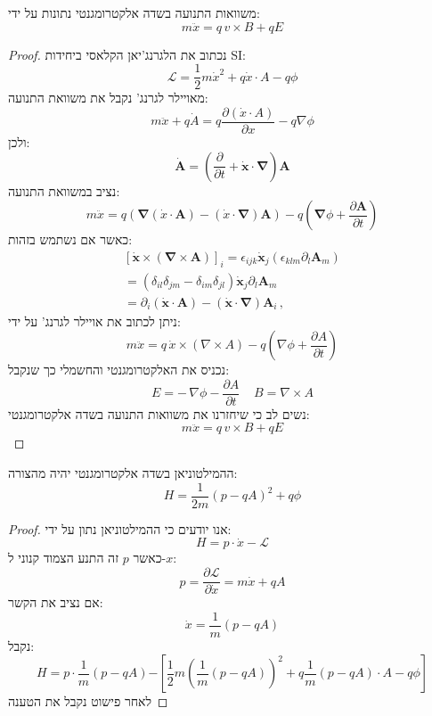 \documentclass{tstextbook}
\begin{document}
\begin{proposition}
משוואות התנועה בשדה אלקטרומגנטי נתונות על ידי:
$$m{\ddot{x}}=q\,v\times B+q E$$

\end{proposition}
\begin{proof}
נכתוב את הלגרנג'יאן הקלאסי ביחידות SI:
$${\mathcal{L}}={\frac{1}{2}}m{\dot{x}}^{2}+q{\dot{x}}\cdot A-q\phi$$
מאויילר לגרנג' נקבל את משוואת התנועה:
$$m{\ddot{x}}+q{\dot{A}}=q{\frac{\partial({\dot{x}}\cdot A)}{\partial x}}-q\nabla\phi$$
ולכן:
$$\dot{\mathbf{A}}=\left({\frac{\partial}{\partial t}}+{\dot{\mathbf{x}}}\cdot\mathbf{\nabla}\right)\mathbf{A}$$
נציב במשוואת התנועה:
$$m{\ddot{x}}=q\left(\mathbf{\nabla}({\dot{x}}\cdot\mathbf{A})-({\dot{x}}\cdot\mathbf{\nabla})\mathbf{A}\right)-q\left(\mathbf{\nabla}\phi+{\frac{\partial\mathbf{A}}{\partial t}}\right)$$
כאשר אם נשתמש בזהות:
$$\begin{array}{c}{{\left[\dot{\mathbf{x}}\times\left(\mathbf{\nabla}\times\mathbf{A}\right)\right]_{i}=\epsilon_{i j k}\dot{\mathbf{x}}_{j}\left(\epsilon_{k l m}\partial_{l}\mathbf{A}_{m}\right)}}\\ {{=\left(\delta_{i l}\delta_{j m}-\delta_{i m}\delta_{j l}\right)\dot{\mathbf{x}}_{j}\partial_{l}\mathbf{A}_{m}}}\\ {{=\partial_{i}\left(\dot{\mathbf{x}}\cdot\mathbf{A}\right)-\left(\dot{\mathbf{x}}\cdot\mathbf{\nabla}\right)\mathbf{A}_{i}\,,}}\end{array}$$
ניתן לכתוב את אויילר לגרנג' על ידי:
$$m{\ddot{x}}=q\,{\dot{x}}\times(\nabla\times A)-q\left(\nabla\phi+{\frac{\partial A}{\partial t}}\right)$$
נכניס את האלקטרומגנטי והחשמלי כך שנקבל:
$$E=-\,\nabla\phi-\frac{\partial A}{\partial t}\;\;\;\;B=\nabla\times A$$
נשים לב כי שיחזרנו את משוואות התנועה בשדה אלקטרומגנטי:
$$m{\ddot{x}}=q\,v\times B+q E$$

\end{proof}
\begin{proposition}
ההמילטוניאן בשדה אלקטרומגנטי יהיה מהצורה:
$$H=\frac{1}{2m}\left(p-q A\right)^{2}+q\phi$$

\end{proposition}
\begin{proof}
אנו יודעים כי ההמילטוניאן נתון על ידי:
$$H=p\cdot\dot{x}-{\mathcal{L}}$$
כאשר \(p\) זה התנע הצמוד קנוני ל-\(x\):
$$p={\frac{\partial{\mathcal{L}}}{\partial{\dot{x}}}}=m{\dot{x}}+q A$$
אם נציב את הקשר:
$${\dot{x}}={\frac{1}{m}}\left(p-q A\right)$$
נקבל:
$${{H=p\cdot\frac{1}{m}\left(p-q A\right)}} {{-\left[\frac{1}{2}m\left(\frac{1}{m}\left(p-q A\right)\right)^{2}+q\frac{1}{m}\left(p-q A\right)\cdot A-q\phi\right]}}$$
לאחר פישוט נקבל את הטענה

\end{proof}
\end{document}

